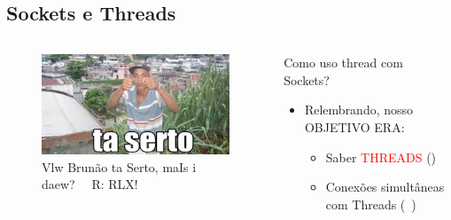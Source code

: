 \documentclass[10pt, xcolor=x11names]{beamer}
\begin{document}
\subsection{Sockets e Threads}
\begin{frame}
	\begin{columns}
			\begin{figure}
				\includegraphics[width=.8\linewidth]{img/taserto.png}
				\caption{Vlw Brunão ta Serto, maIs i daew? ~~R: RLX!}
			\end{figure}
		

		\begin{block}{Como uso thread com Sockets?}
			\begin{itemize}
				\item Relembrando, nosso OBJETIVO ERA:
					\begin{itemize}
						\item Saber \textcolor{red}{THREADS} (\checkmark)
						\item Conexões simultâneas com Threads (~)
					\end{itemize}
			\end{itemize}
		\end{block}
		
	\end{columns}
\end{frame}
\end{document}
